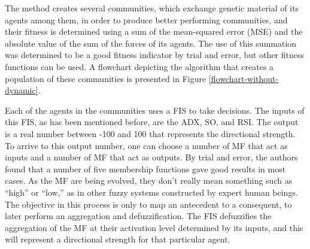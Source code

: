 \documentclass[a4paper,twoside]{article}
\begin{document}
The method creates several communities, which exchange genetic
material of its agents among them, in order to produce better
performing communities, and their fitness is determined using a sum of
the mean-squared error (MSE) and the absolute value of the sum of the
forces of its agents. The use of this summation was determined to be a
good fitness indicator by trial and error, but other fitness functions
can be used. A flowchart depicting the algorithm that creates a
population of these communities is presented in Figure
\ref{flowchart-without-dynamic}. %




Each of the agents in the communities uses a FIS to take
decisions. The inputs of this FIS, as has been mentioned before, are
the ADX, SO, and RSI. The output is a real number between -100 and 100
that represents the directional strength. To arrive to this output
number, one can choose a number of MF that act as inputs and a number
of MF that act as outputs. By trial and error, the authors found that
a number of five membership functions gave good results in most cases. %
%
As the MF are being evolved, they don't really mean something such as
``high'' or ``low,'' as in other fuzzy systems constructed by expert
human beings. The objective in this process is only to map an
antecedent to a consequent, to later perform an aggregation and
defuzzification. %
The FIS
defuzzifies the aggregation of the MF at their activation level
determined by its inputs, and this will represent a directional
strength for that particular agent. 
\end{document}
